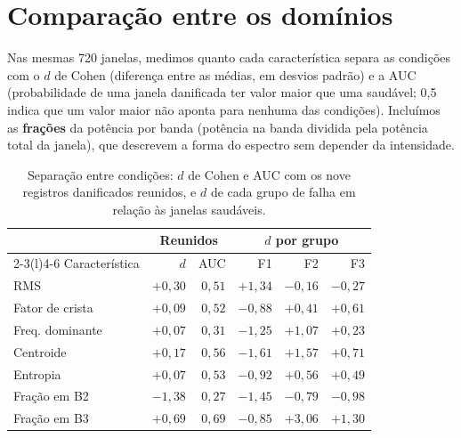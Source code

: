 
\section{Comparação entre os domínios}\label{sec:comp}
Nas mesmas 720 janelas, medimos quanto cada característica separa as condições com o $d$ de Cohen (diferença entre as médias, em desvios padrão) e a AUC (probabilidade de uma janela danificada ter valor maior que uma saudável; 0,5 indica que um valor maior não aponta para nenhuma das condições). Incluímos as \textbf{frações} da potência por banda (potência na banda dividida pela potência total da janela), que descrevem a forma do espectro sem depender da intensidade.

\begin{table}[!ht]
\caption{Separação entre condições: $d$ de Cohen e AUC com os nove registros danificados reunidos, e $d$ de cada grupo de falha em relação às janelas saudáveis.}
\label{tab:comp}\centering\small\setlength{\tabcolsep}{3.5pt}
\begin{tabular}{@{}lrrrrr@{}}\toprule
 & \multicolumn{2}{c}{Reunidos} & \multicolumn{3}{c}{$d$ por grupo}\\\cmidrule(lr){2-3}\cmidrule(l){4-6}
Característica & $d$ & AUC & F1 & F2 & F3\\\midrule
RMS & $+0{,}30$ & $0{,}51$ & $+1{,}34$ & $-0{,}16$ & $-0{,}27$\\
Fator de crista & $+0{,}09$ & $0{,}52$ & $-0{,}88$ & $+0{,}41$ & $+0{,}61$\\\midrule
Freq. dominante & $+0{,}07$ & $0{,}31$ & $-1{,}25$ & $+1{,}07$ & $+0{,}23$\\
Centroide & $+0{,}17$ & $0{,}56$ & $-1{,}61$ & $+1{,}57$ & $+0{,}71$\\
Entropia & $+0{,}07$ & $0{,}53$ & $-0{,}92$ & $+0{,}56$ & $+0{,}49$\\
Fração em B2 & $-1{,}38$ & $0{,}27$ & $-1{,}45$ & $-0{,}79$ & $-0{,}98$\\
Fração em B3 & $+0{,}69$ & $0{,}69$ & $-0{,}85$ & $+3{,}06$ & $+1{,}30$\\\bottomrule
\end{tabular}
\end{table}

